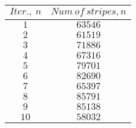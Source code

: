 \begin{tabular}{| c | c |}
\hline
$Iter., \: n$ & $Num \: of \: stripes, n$ \\
\hline 
$1$ & $63546$\\
\hline
$2$ & $61519$\\
\hline
$3$ & $71886$\\
\hline
$4$ & $67316$\\
\hline
$5$ & $79701$\\
\hline
$6$ & $82690$\\
\hline
$7$ & $65397$\\
\hline
$8$ & $85791$\\
\hline
$9$ & $85138$\\
\hline
$10$ & $58032$\\
\hline
\end{tabular}
